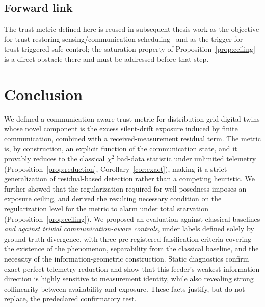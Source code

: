 \documentclass[journal]{IEEEtran}
\theoremstyle{plain}
\theoremstyle{definition}
\theoremstyle{remark}
\begin{document}
\subsection{Forward link}
The trust metric defined here is reused in subsequent thesis work as the
objective for trust-restoring sensing/communication
scheduling~\cite{bui2024,chiariotti2022} and as the trigger for
trust-triggered safe control; the saturation property of
Proposition~\ref{prop:ceiling} is a direct obstacle there and must be
addressed before that step.

\section{Conclusion}
\label{sec:conclusion}
We defined a communication-aware trust metric for distribution-grid
digital twins whose novel component is the excess silent-drift exposure
induced by finite communication, combined with a received-measurement
residual term. The metric is, by construction, an explicit function of
the communication state, and it provably reduces to the classical
$\chi^{2}$ bad-data statistic under unlimited telemetry
(Proposition~\ref{prop:reduction}, Corollary~\ref{cor:exact}), making it a
strict generalization of residual-based detection rather than a competing
heuristic. We further showed that the regularization required for
well-posedness imposes an exposure ceiling, and derived the resulting
necessary condition on the regularization level for the metric to alarm
under total starvation (Proposition~\ref{prop:ceiling}). We proposed an
evaluation against classical baselines \emph{and against trivial
communication-aware controls}, under labels defined solely by ground-truth
divergence, with three pre-registered falsification criteria covering the
existence of the phenomenon, separability from the classical baseline, and
the necessity of the information-geometric construction. Static
diagnostics confirm exact perfect-telemetry reduction and show that this
feeder's weakest information direction is highly sensitive to measurement
identity, while also revealing strong collinearity between availability
and exposure. These facts justify, but do not replace, the predeclared
confirmatory test.
\end{document}
